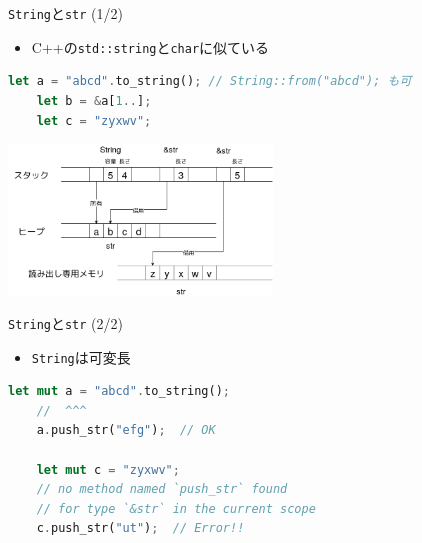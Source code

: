 \documentclass[cjk,dvipdfmx,10pt,compress,fragile%
hyperref={bookmarks=true,bookmarksnumbered=true,bookmarksopen=false,%
colorlinks=false,%
pdftitle={第 134 回 関西 Debian 勉強会},%
pdfauthor={小林},%
pdfsubject={資料},%
}]{beamer}
\newenvironment{commandline}%
{\VerbatimEnvironment
  \begin{Sbox}\begin{minipage}{0.9\hsize}\begin{fontsize}{8}{8} \color{white} \begin{BVerbatim}}%
{\end{BVerbatim}\end{fontsize}\end{minipage}\end{Sbox}
  \setlength{\fboxsep}{8pt}

\vspace{6pt}%
\fcolorbox{white}{black}{\TheSbox}

\vspace{3pt}%
}
\begin{document}
\begin{frame}[t,fragile]{\texttt{String}と\texttt{str} (1/2)}
\begin{itemize}
 \item C++の\texttt{std::string}と\texttt{char}に似ている
\end{itemize}
\begin{lstlisting}[language=Rust,style=boxed,style=colouredRust,basicstyle=\small\tt,lineskip=-2pt]
    let a = "abcd".to_string(); // String::from("abcd"); も可
    let b = &a[1..];
    let c = "zyxwv";\end{lstlisting}
\begin{center}
 \includegraphics[keepaspectratio,height=4cm]{./img/rustlang-str-string.png}
\end{center}
\end{frame}

\begin{frame}[t,fragile]{\texttt{String}と\texttt{str} (2/2)}
\begin{itemize}
 \item \texttt{String}は可変長
\end{itemize}
\begin{lstlisting}[language=Rust,style=boxed,style=colouredRust,basicstyle=\small\tt,lineskip=-2pt]
    let mut a = "abcd".to_string();
    //  ^^^
    a.push_str("efg");  // OK

    let mut c = "zyxwv";
    // no method named `push_str` found
    // for type `&str` in the current scope
    c.push_str("ut");  // Error!! \end{lstlisting}
\end{frame}

\end{document}

